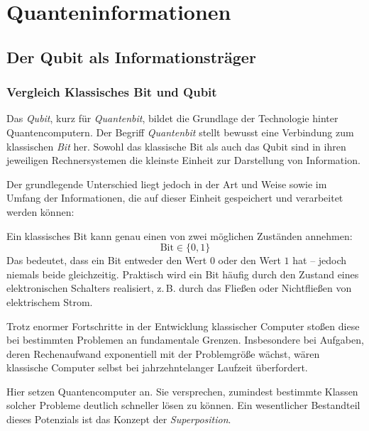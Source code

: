 \chapter{Quanteninformationen}
\label{qbits} %



\section{Der Qubit als Informationsträger}
\subsection{Vergleich Klassisches Bit und Qubit}
Das \emph{Qubit}, kurz für \emph{Quantenbit}, bildet die Grundlage der Technologie hinter Quantencomputern. Der Begriff \emph{Quantenbit} stellt bewusst eine Verbindung zum klassischen \emph{Bit} her. Sowohl das klassische Bit als auch das Qubit sind in ihren jeweiligen Rechnersystemen die kleinste Einheit zur Darstellung von Information.

Der grundlegende Unterschied liegt jedoch in der Art und Weise sowie im Umfang der Informationen, die auf dieser Einheit gespeichert und verarbeitet werden können:

Ein klassisches Bit kann genau einen von zwei möglichen Zuständen annehmen:
\[
\text{Bit} \in \{0, 1\}
\]
Das bedeutet, dass ein Bit entweder den Wert \(0\) oder den Wert \(1\) hat – jedoch niemals beide gleichzeitig. Praktisch wird ein Bit häufig durch den Zustand eines elektronischen Schalters realisiert, z.\,B. durch das Fließen oder Nichtfließen von elektrischem Strom.

Trotz enormer Fortschritte in der Entwicklung klassischer Computer stoßen diese bei bestimmten Problemen an fundamentale Grenzen. Insbesondere bei Aufgaben, deren Rechenaufwand exponentiell mit der Problemgröße wächst, wären klassische Computer selbst bei jahrzehntelanger Laufzeit überfordert.

Hier setzen Quantencomputer an. Sie versprechen, zumindest bestimmte Klassen solcher Probleme deutlich schneller lösen zu können. Ein wesentlicher Bestandteil dieses Potenzials ist das Konzept der \emph{Superposition}.

